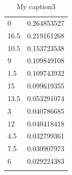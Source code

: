 \begin{longtable}{|l|l|}
	\rowcolor[HTML]{F8FF00} 
	0                                                       & 0.264853527                                                   \\
	\rowcolor[HTML]{F8FF00} 
	16.5                                                    & 0.219161268                                                   \\
	\rowcolor[HTML]{32CB00} 
	10.5                                                    & 0.153723538                                                   \\
	\rowcolor[HTML]{32CB00} 
	9                                                       & 0.109849108                                                   \\
	\rowcolor[HTML]{32CB00} 
	1.5                                                     & 0.109743932                                                   \\
	\rowcolor[HTML]{32CB00} 
	15                                                      & 0.099619355                                                   \\
	\rowcolor[HTML]{32CB00} 
	13.5                                                    & 0.053291074                                                   \\
	\rowcolor[HTML]{32CB00} 
	3                                                       & 0.040786685                                                   \\
	\rowcolor[HTML]{32CB00} 
	12                                                      & 0.040418418                                                   \\
	\rowcolor[HTML]{32CB00} 
	4.5                                                     & 0.032799361                                                   \\
	\rowcolor[HTML]{32CB00} 
	7.5                                                     & 0.030907973                                                   \\
	\rowcolor[HTML]{32CB00} 
	6                                                       & 0.029224383         \\ \hline
	\caption{My caption3}
	\label{my-label4}
\end{longtable}

